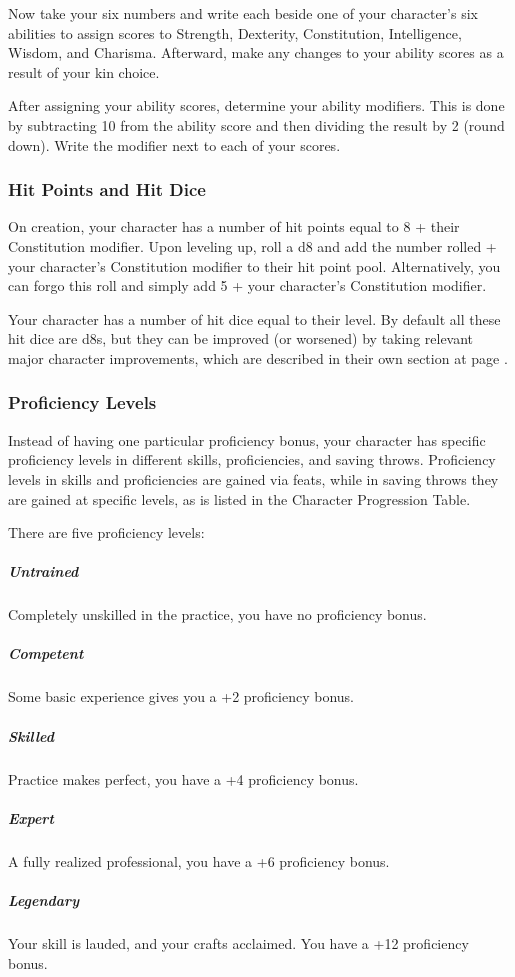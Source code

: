         Now take your six numbers and write each beside one of your character's six abilities to assign scores to Strength, Dexterity, Constitution, Intelligence, Wisdom, and Charisma.
        Afterward, make any changes to your ability scores as a result of your kin choice.

        After assigning your ability scores, determine your ability modifiers.
        This is done by subtracting 10 from the ability score and then dividing the result by 2 (round down).
        Write the modifier next to each of your scores.

    \subsubsection{Hit Points and Hit Dice}
        On creation, your character has a number of hit points equal to 8 + their Constitution modifier.
        Upon leveling up, roll a d8 and add the number rolled + your character's Constitution modifier to their hit point pool.
        Alternatively, you can forgo this roll and simply add 5 + your character's Constitution modifier.

        Your character has a number of hit dice equal to their level.
        By default all these hit dice are d8s, but they can be improved (or worsened) by taking relevant major character improvements, which are described in their own section at page \pageref{sec::majorcharacterimprovements}.

    \subsubsection{Proficiency Levels}
        Instead of having one particular proficiency bonus, your character has specific proficiency levels in different skills, proficiencies, and saving throws.
        Proficiency levels in skills and proficiencies are gained via feats, while in saving throws they are gained at specific levels, as is listed in the Character Progression Table.

        There are five proficiency levels:
        \subparagraph{Untrained} Completely unskilled in the practice, you have no proficiency bonus.
        \subparagraph{Competent} Some basic experience gives you a +2 proficiency bonus.
        \subparagraph{Skilled} Practice makes perfect, you have a +4 proficiency bonus.
        \subparagraph{Expert} A fully realized professional, you have a +6 proficiency bonus.
        \subparagraph{Legendary} Your skill is lauded, and your crafts acclaimed.
        You have a +12 proficiency bonus.

